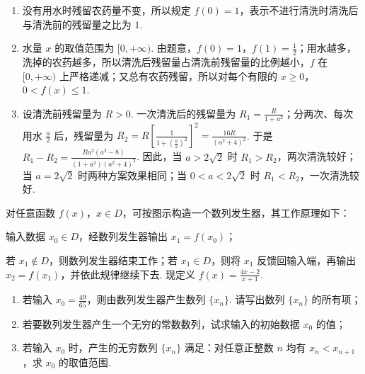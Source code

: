 \begin{solution}
\begin{enumerate}
\item 没有用水时残留农药量不变，所以规定 \(f(0)=1\)，表示不进行清洗时清洗后与清洗前的残留量之比为 \(1\).
\item 水量 \(x\) 的取值范围为 \([0,+\infty)\). 由题意，\(f(0)=1\)，\(f(1)=\frac12\)；用水越多，洗掉的农药越多，所以清洗后残留量占清洗前残留量的比例越小，\(f\) 在 \([0,+\infty)\) 上严格递减；又总有农药残留，所以对每个有限的 \(x\geqslant0\)，\(0<f(x)\leqslant1\).
\item 设清洗前残留量为 \(R>0\). 一次清洗后的残留量为 \(R_1=\frac{R}{1+a^2}\)；分两次、每次用水 \(\frac a2\) 后，残留量为 \(R_2=R\left[\frac{1}{1+(\frac{a}{2})^2}\right]^2=\frac{16R}{(a^2+4)^2}\). 于是 \(R_1-R_2=\frac{Ra^2(a^2-8)}{(1+a^2)(a^2+4)^2}\). 因此，当 \(a>2\sqrt2\) 时 \(R_1>R_2\)，两次清洗较好；当 \(a=2\sqrt2\) 时两种方案效果相同；当 \(0<a<2\sqrt2\) 时 \(R_1<R_2\)，一次清洗较好.
\end{enumerate}
\end{solution}

\begin{problem}
对任意函数 \(f(x)\)，\(x\in D\)，可按图示构造一个数列发生器，其工作原理如下：

\begin{circlelist}
\item 输入数据 \(x_0\in D\)，经数列发生器输出 \(x_1=f(x_0)\)；
\item 若 \(x_1\notin D\)，则数列发生器结束工作；若 \(x_1\in D\)，则将 \(x_1\) 反馈回输入端，再输出 \(x_2=f(x_1)\)，并依此规律继续下去. 现定义 \(f(x)=\frac{4x-2}{x+1}\).
\end{circlelist}

\begin{enumerate}
\item 若输入 \(x_0=\frac{49}{65}\)，则由数列发生器产生数列 \(\{x_n\}\). 请写出数列 \(\{x_n\}\) 的所有项；
\item 若要数列发生器产生一个无穷的常数数列，试求输入的初始数据 \(x_0\) 的值；
\item 若输入 \(x_0\) 时，产生的无穷数列 \(\{x_n\}\) 满足：对任意正整数 \(n\) 均有 \(x_n<x_{n+1}\)，求 \(x_0\) 的取值范围.
\end{enumerate}

\end{problem}

